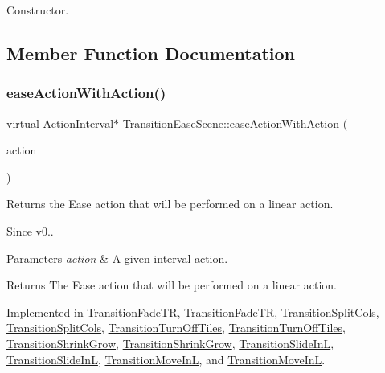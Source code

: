 Constructor. 

\subsection{Member Function Documentation}
\mbox{\label{classTransitionEaseScene_a6f27540600b0d703ed30adc8976e65df}} 
\subsubsection{\texorpdfstring{ease\+Action\+With\+Action()}{easeActionWithAction()}\hspace{0.1cm}{\footnotesize\ttfamily [1/2]}}
{\footnotesize\ttfamily virtual \hyperlink{classActionInterval}{Action\+Interval}$\ast$ Transition\+Ease\+Scene\+::ease\+Action\+With\+Action (\begin{DoxyParamCaption}\item[{\hyperlink{classActionInterval}{Action\+Interval} $\ast$}]{action }\end{DoxyParamCaption})\hspace{0.3cm}{\ttfamily [pure virtual]}}

Returns the Ease action that will be performed on a linear action. \begin{DoxySince}{Since}
v0..
\end{DoxySince}

\begin{DoxyParams}{Parameters}
{\em action} & A given interval action. \\
\hline
\end{DoxyParams}
\begin{DoxyReturn}{Returns}
The Ease action that will be performed on a linear action. 
\end{DoxyReturn}


Implemented in \hyperlink{classTransitionFadeTR_a044517e402fd76f102f143c8e00dc852}{Transition\+Fade\+TR}, \hyperlink{classTransitionFadeTR_aa802204cdcae09fa5acacfee75200a11}{Transition\+Fade\+TR}, \hyperlink{classTransitionSplitCols_a4e9f0eafce932c38cb22e5551f487661}{Transition\+Split\+Cols}, \hyperlink{classTransitionSplitCols_a0a9a7b0062cf654a712a17887d4db251}{Transition\+Split\+Cols}, \hyperlink{classTransitionTurnOffTiles_a0aa4b9097d9dce78011713c44e3cd4b8}{Transition\+Turn\+Off\+Tiles}, \hyperlink{classTransitionTurnOffTiles_ab97d4817adc0214335c27b055ef29631}{Transition\+Turn\+Off\+Tiles}, \hyperlink{classTransitionShrinkGrow_af2d5d53552fcfe2f8d61f89f1663444d}{Transition\+Shrink\+Grow}, \hyperlink{classTransitionShrinkGrow_a82ee7adb79f7d88a67a281736f2c19ba}{Transition\+Shrink\+Grow}, \hyperlink{classTransitionSlideInL_a2f3669a542e5cfe1c56a86626f222039}{Transition\+Slide\+InL}, \hyperlink{classTransitionSlideInL_a33aad529498bca2822e6e6f12e78ad4c}{Transition\+Slide\+InL}, \hyperlink{classTransitionMoveInL_a298883652b158cc690f487c011b75255}{Transition\+Move\+InL}, and \hyperlink{classTransitionMoveInL_ab9e3308035155049f79a074ade4de8a1}{Transition\+Move\+InL}.

